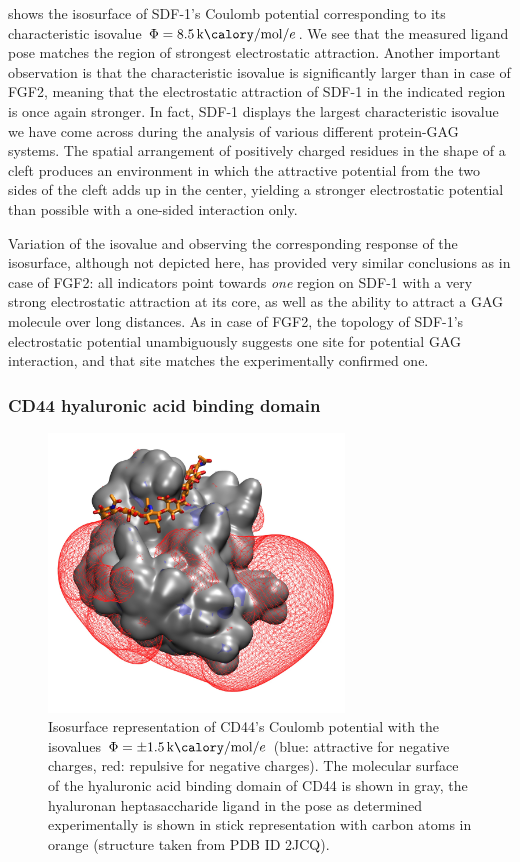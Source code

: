  shows the isosurface of SDF-1's Coulomb potential
corresponding to its characteristic isovalue
$\Phi=\SI{8.5}{\kilo\calory\per\mole\per\elementarycharge}$. We see that the
measured ligand pose matches the region of strongest electrostatic attraction.
Another important observation is that the characteristic isovalue is
significantly larger than in case of FGF2, meaning that the electrostatic
attraction of SDF-1 in the indicated region is once again stronger. In fact,
SDF-1 displays the largest characteristic isovalue we have come across during
the analysis of various different protein-GAG systems. The spatial arrangement
of positively charged residues in the shape of a cleft produces an environment
in which the attractive potential from the two sides of the cleft adds up in the
center, yielding a stronger electrostatic potential than possible with a
one-sided interaction only.

Variation of the isovalue and observing the corresponding response of the
isosurface, although not depicted here, has provided very similar conclusions as
in case of FGF2: all indicators point towards \textit{one} region on SDF-1 with
a very strong electrostatic attraction at its core, as well as the ability to
attract a GAG molecule over long distances. As in case of FGF2, the topology of
SDF-1's electrostatic potential unambiguously suggests one site for potential
GAG interaction, and that site matches the experimentally confirmed one.


\subsubsection{CD44 hyaluronic acid binding domain}

\begin{figure}
\centering
\includegraphics[width=0.7\textwidth]{gfx/bspred/2JCQ_isopot500_ligand_view1.jpg}
\caption[]{
Isosurface representation of CD44's Coulomb potential with the isovalues
$\Phi=\pm\SI{1.5}{\kilo\calory\per\mole\per\elementarycharge}$ (blue: attractive
for negative charges, red: repulsive for negative charges). The molecular
surface of the hyaluronic acid binding domain of CD44 is shown in gray, the
hyaluronan heptasaccharide ligand in the pose as determined experimentally is
shown in stick representation with carbon atoms in orange (structure taken from
PDB ID 2JCQ).}
\label{fig:bspred:cd44_estatic}
\end{figure}

